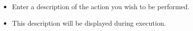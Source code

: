 

\begin{itemize}
\item Enter a description of the action you wish to be performed.
\item This description will be displayed during execution.
\end{itemize}
